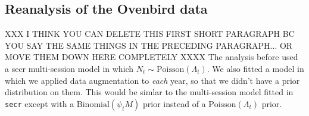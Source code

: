 \subsection{Reanalysis of the Ovenbird data}

XXX I THINK YOU CAN DELETE THIS FIRST SHORT PARAGRAPH BC YOU SAY THE SAME THINGS IN THE PRECEDING PARAGRAPH... OR MOVE THEM DOWN HERE COMPLETELY XXXX
The analysis before used a secr multi-session model in which $N_{t}
\sim 
\mbox{Poisson}(\Lambda_{t})$. We also fitted a model in which we applied
data augmentation to {\it each} year, so that we didn't have a prior
distribution on them.  This would be simlar to the multi-session model
fitted in \mbox{\tt secr} except with a $\mbox{Binomial}(\psi_{t}M)$
prior instead of a $\mbox{Poisson}(\Lambda_{t})$ prior.


